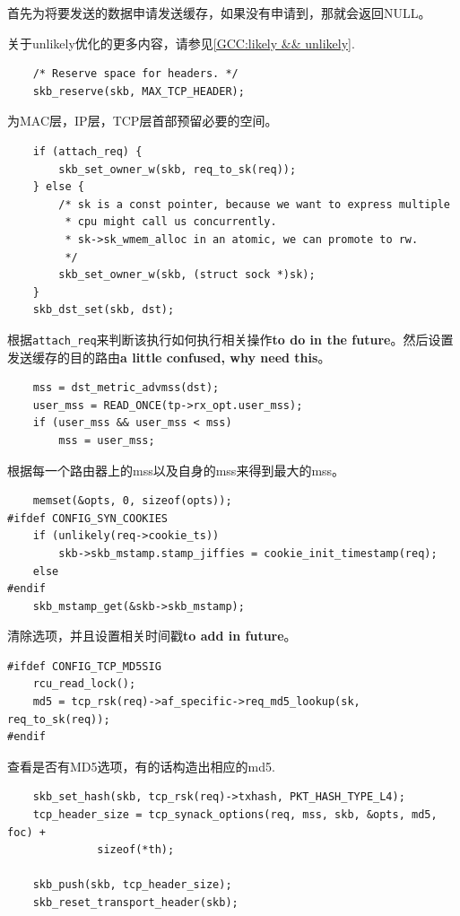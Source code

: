     首先为将要发送的数据申请发送缓存，如果没有申请到，那就会返回NULL。

	关于unlikely优化的更多内容，请参见\ref{GCC:likely && unlikely}.

\begin{verbatim}
    /* Reserve space for headers. */
    skb_reserve(skb, MAX_TCP_HEADER);
\end{verbatim}

    为MAC层，IP层，TCP层首部预留必要的空间。

\begin{verbatim}
    if (attach_req) {
        skb_set_owner_w(skb, req_to_sk(req));
    } else {
        /* sk is a const pointer, because we want to express multiple
         * cpu might call us concurrently.
         * sk->sk_wmem_alloc in an atomic, we can promote to rw.
         */
        skb_set_owner_w(skb, (struct sock *)sk);
    }
    skb_dst_set(skb, dst);
\end{verbatim}

    根据\texttt{attach_req}来判断该执行如何执行相关操作\textbf{to do in the future}。然后设置发送缓存的目的路由\textbf{a little confused, why need this}。

\begin{verbatim}
    mss = dst_metric_advmss(dst);
    user_mss = READ_ONCE(tp->rx_opt.user_mss);
    if (user_mss && user_mss < mss)
        mss = user_mss;
\end{verbatim}

    根据每一个路由器上的mss以及自身的mss来得到最大的mss。

\begin{verbatim}
    memset(&opts, 0, sizeof(opts));
#ifdef CONFIG_SYN_COOKIES
    if (unlikely(req->cookie_ts))
        skb->skb_mstamp.stamp_jiffies = cookie_init_timestamp(req);
    else
#endif
    skb_mstamp_get(&skb->skb_mstamp);
\end{verbatim}

    清除选项，并且设置相关时间戳\textbf{to add in future}。

\begin{verbatim}
#ifdef CONFIG_TCP_MD5SIG
    rcu_read_lock();
    md5 = tcp_rsk(req)->af_specific->req_md5_lookup(sk, req_to_sk(req));
#endif
\end{verbatim}

    查看是否有MD5选项，有的话构造出相应的md5.

\begin{verbatim}
    skb_set_hash(skb, tcp_rsk(req)->txhash, PKT_HASH_TYPE_L4);
    tcp_header_size = tcp_synack_options(req, mss, skb, &opts, md5, foc) +
              sizeof(*th);

    skb_push(skb, tcp_header_size);
    skb_reset_transport_header(skb);
\end{verbatim}


